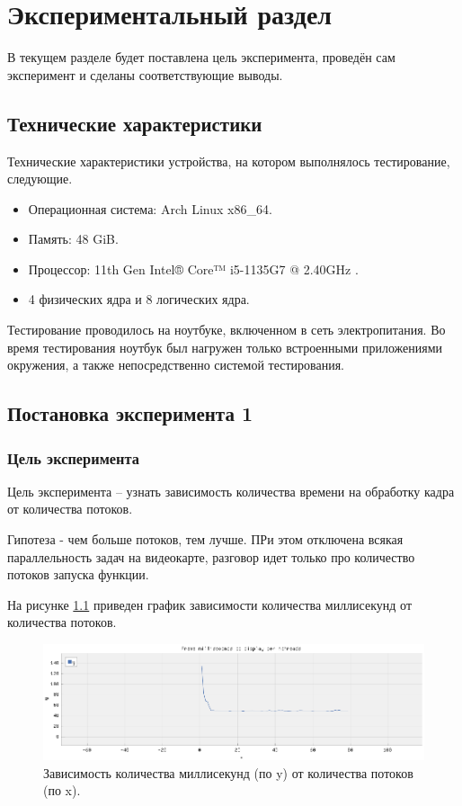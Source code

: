 \chapter{Экспериментальный раздел}
В текущем разделе будет поставлена цель эксперимента, проведён сам эксперимент и сделаны соответствующие выводы. 

\section{Технические характеристики}

Технические характеристики устройства, на котором выполнялось тестирование, следующие.

\begin{itemize}
	\item Операционная система: Arch Linux \cite{oswind} x86\_64.
	\item Память: 48 GiB.
	\item Процессор: 11th Gen Intel® Core™ i5-1135G7 @ 2.40GHz \cite{intel}.
	\item 4 физических ядра и 8 логических ядра.
\end{itemize}

Тестирование проводилось на ноутбуке, включенном в сеть электропитания. Во время тестирования ноутбук был нагружен только встроенными приложениями окружения, а также непосредственно системой тестирования.


\section{Постановка эксперимента 1} 

\subsection{Цель эксперимента}
Цель эксперимента -- узнать зависимость количества времени на обработку кадра от количества потоков.

Гипотеза - чем больше потоков, тем лучше. ПРи этом отключена всякая параллельность задач на видеокарте, разговор идет только про количество потоков запуска функции.

На рисунке \ref{img:e4} приведен график зависимости количества миллисекунд от количества потоков.

\begin{figure}[H]
	\begin{center}
		\includegraphics[scale=0.60]{img/avg_time_focused.png}
	\end{center}
	\captionsetup{justification=centering}
	\caption{Зависимость количества миллисекунд (по y) от количества потоков (по x). }
	\label{img:e4}
\end{figure}


